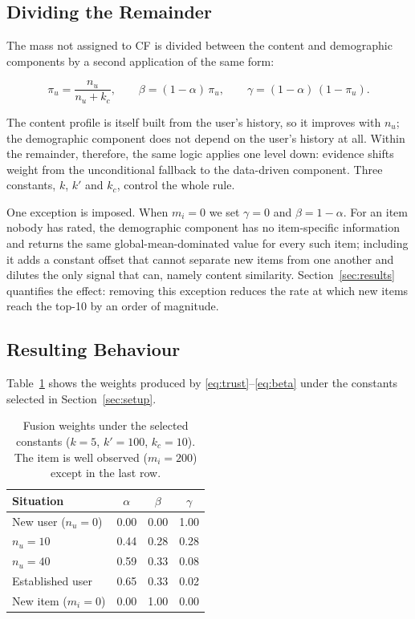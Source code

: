 \documentclass[conference]{IEEEtran}
\begin{document}
\subsection{Dividing the Remainder}

The mass not assigned to CF is divided between the content and
demographic components by a second application of the same form:

\begin{equation}
\pi_u = \frac{n_u}{n_u + k_c}, \qquad
\beta = (1-\alpha)\,\pi_u, \qquad
\gamma = (1-\alpha)\,(1 - \pi_u) .
\label{eq:beta}
\end{equation}

The content profile is itself built from the user's history, so it
improves with $n_u$; the demographic component does not depend on
the user's history at all. Within the remainder, therefore, the same
logic applies one level down: evidence shifts weight from the
unconditional fallback to the data-driven component. Three
constants, $k$, $k'$ and $k_c$, control the whole rule.

One exception is imposed. When $m_i = 0$ we set $\gamma = 0$ and
$\beta = 1 - \alpha$. For an item nobody has rated, the demographic
component has no item-specific information and returns the same
global-mean-dominated value for every such item; including it adds a
constant offset that cannot separate new items from one another and
dilutes the only signal that can, namely content similarity.
Section~\ref{sec:results} quantifies the effect: removing this
exception reduces the rate at which new items reach the top-10 by an
order of magnitude.

\subsection{Resulting Behaviour}

Table~\ref{tab:weights} shows the weights produced by
\eqref{eq:trust}--\eqref{eq:beta} under the constants selected in
Section~\ref{sec:setup}.

\begin{table}[t]
\caption{Fusion weights under the selected constants
($k=5$, $k'=100$, $k_c=10$). The item is well observed
($m_i = 200$) except in the last row.}
\label{tab:weights}
\centering
\begin{tabular}{lccc}
\toprule
Situation & $\alpha$ & $\beta$ & $\gamma$ \\
\midrule
New user ($n_u = 0$)        & 0.00 & 0.00 & 1.00 \\
$n_u = 10$                  & 0.44 & 0.28 & 0.28 \\
$n_u = 40$                  & 0.59 & 0.33 & 0.08 \\
Established user            & 0.65 & 0.33 & 0.02 \\
New item ($m_i = 0$)        & 0.00 & 1.00 & 0.00 \\
\bottomrule
\end{tabular}
\end{table}
\end{document}
